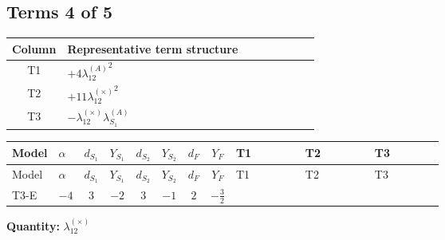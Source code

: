 \documentclass[8pt]{article}
\begin{document}
\begin{landscape}
\subsection*{Terms 4 of 5}
\begin{center}
\begin{tabular}{@{}c >{\raggedright\arraybackslash}p{0.82\linewidth}@{}}
\toprule
Column & Representative term structure \\
\midrule
T1 & \(\displaystyle +4 {\lambda_{12}^{(A)}}^2\) \\
\midrule
T2 & \(\displaystyle +11 {\lambda_{12}^{(\times)}}^2\) \\
\midrule
T3 & \(\displaystyle -{\lambda_{12}^{(\times)}} {\lambda_{S_1}^{(A)}}\) \\
\midrule
\bottomrule
\end{tabular}
\end{center}
\smallskip
\tiny
\begin{longtable}{@{}llcccccc >{\raggedright\arraybackslash}p{0.21\linewidth} >{\raggedright\arraybackslash}p{0.21\linewidth} >{\raggedright\arraybackslash}p{0.21\linewidth}@{}}
\toprule
Model & $\alpha$ & $d_{S_1}$ & $Y_{S_1}$ & $d_{S_2}$ & $Y_{S_2}$ & $d_F$ & $Y_F$ & T1 & T2 & T3 \\
\midrule
\endfirsthead
\toprule
Model & $\alpha$ & $d_{S_1}$ & $Y_{S_1}$ & $d_{S_2}$ & $Y_{S_2}$ & $d_F$ & $Y_F$ & T1 & T2 & T3 \\
\midrule
\endhead
T3-E & $-4$ & $3$ & $-2$ & $3$ & $-1$ & $2$ & $-\frac{3}{2}$ & \scriptsize\adjustbox{max width=\linewidth}{$\begin{gathered} +4 {\lambda_{12}^{(A)}}^2\end{gathered}$} & \scriptsize\adjustbox{max width=\linewidth}{$\begin{gathered} +11 {\lambda_{12}^{(\times)}}^2\end{gathered}$} & \scriptsize\adjustbox{max width=\linewidth}{$\begin{gathered} -{\lambda_{12}^{(\times)}} {\lambda_{S_1}^{(A)}}\end{gathered}$} \\
\midrule
\bottomrule
\end{longtable}
\clearpage
\noindent\textbf{Quantity: }$\lambda_{12}^{(\times)}$\par\smallskip

\end{landscape}
\end{document}
